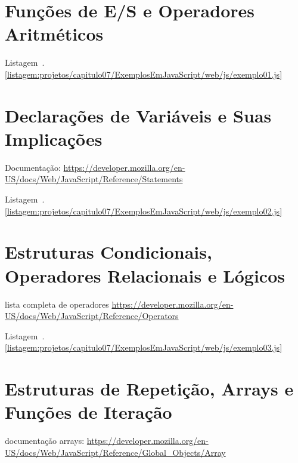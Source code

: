 \section{Funções de E/S e Operadores Aritméticos}

Listagem~\thechapter.\ref{listagem:projetos/capitulo07/ExemplosEmJavaScript/web/js/exemplo01.js}




\section{Declarações de Variáveis e Suas Implicações}

Documentação: \url{https://developer.mozilla.org/en-US/docs/Web/JavaScript/Reference/Statements}

Listagem~\thechapter.\ref{listagem:projetos/capitulo07/ExemplosEmJavaScript/web/js/exemplo02.js}




\section{Estruturas Condicionais, Operadores Relacionais e Lógicos}

lista completa de operadores
\url{https://developer.mozilla.org/en-US/docs/Web/JavaScript/Reference/Operators}

Listagem~\thechapter.\ref{listagem:projetos/capitulo07/ExemplosEmJavaScript/web/js/exemplo03.js}




\section{Estruturas de Repetição, Arrays e Funções de Iteração}

documentação arrays:
\url{https://developer.mozilla.org/en-US/docs/Web/JavaScript/Reference/Global_Objects/Array}

